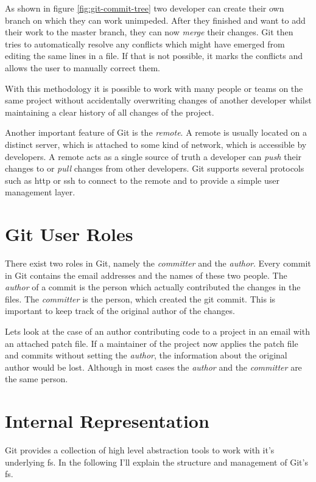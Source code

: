 As shown in figure \ref{fig:git-commit-tree} two developer can create their own branch on which they can work unimpeded.
After they finished and want to add their work to the master branch, they can now \emph{merge} their changes.
Git then tries to automatically resolve any conflicts which might have emerged from editing the same lines in a file.
If that is not possible, it marks the conflicts and allows the user to manually correct them.


With this methodology it is possible to work with many people or teams on the same project without accidentally overwriting changes of another developer whilst maintaining a clear history of all changes of the project.

Another important feature of Git is the \emph{remote}.
A remote is usually located on a distinct server, which is attached to some kind of network, which is accessible by developers.
A remote acts as a single source of truth a developer can \emph{push} their changes to or \emph{pull} changes from other developers.
Git supports several protocols such as \ac{http} or \ac{ssh} to connect to the remote and to provide a simple user management layer.


\section{Git User Roles}
There exist two roles in Git, namely the \emph{committer} and the \emph{author}.
Every commit in Git contains the email addresses and the names of these two people.
The \emph{author} of a commit is the person which actually contributed the changes in the files.
The \emph{committer} is the person, which created the git commit.
This is important to keep track of the original author of the changes.

Lets look at the case of an author contributing code to a project in an email with an attached patch file.
If a maintainer of the project now applies the patch file and commits without setting the \emph{author}, the information about the original author would be lost.
Although in most cases the \emph{author} and the \emph{committer} are the same person. 


\section{Internal Representation}
Git provides a collection of high level abstraction tools to work with it's underlying \ac{fs}.
In the following I'll explain the structure and management of Git's \ac{fs}.

